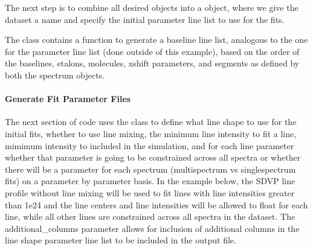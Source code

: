 \documentclass[letterpaper,10pt,english]{sphinxmanual}
\begin{document}
\sphinxAtStartPar
The next step is to combine all desired  objects  into a {\hyperref[\detokenize{MATS:MATS.dataset.Dataset}]{}} object, where we give the dataset a name and specify the initial parameter line list to use for the fits.

\begin{sphinxVerbatim}[commandchars=\\\{\}]
  \PYG{p}{[}   \PYG{p}{]}    
\end{sphinxVerbatim}

\sphinxAtStartPar
The {\hyperref[\detokenize{MATS:MATS.dataset.Dataset}]{}} class contains a function to generate a baseline line list, analogous to the one for the parameter line list (done outside of this example), based on the order of the baselines, etalons, molecules, x\sphinxhyphen{}shift parameters, and segments as defined by both the spectrum objects.

\begin{sphinxVerbatim}[commandchars=\\\{\}]
  
\end{sphinxVerbatim}


\paragraph{Generate Fit Parameter Files}
\label{\detokenize{Fitting Experimental Spectra:generate-fit-parameter-files}}
\sphinxAtStartPar
The next section of code uses the {\hyperref[\detokenize{MATS:MATS.generate_fitparam_file.Generate_FitParam_File}]{}} class to define what line shape to use for the initial fits, whether to use line mixing, the minimum line intensity to fit a line, mimimum intensity to included in the simulation, and for each line parameter whether that parameter is going to be constrained across all spectra or whether there will be a parameter for each spectrum (multi\sphinxhyphen{}spectrum vs single\sphinxhyphen{}spectrum fits) on a parameter by parameter basis. In the example below, the SDVP line profile without line mixing will be used to fit lines with line intensities greater than 1e\sphinxhyphen{}24 and the line centers and line intensities will be allowed to float for each line, while all other lines are constrained across all spectra in the dataset. The additional\_columns parameter allows for inclusion of additional columns in the line shape parameter line list to be included in the output file.
\end{document}
